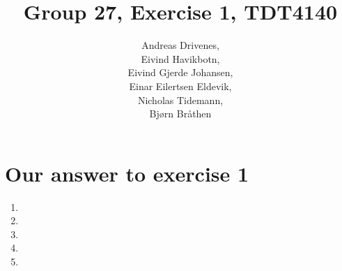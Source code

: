 \documentclass[english, a4paper]{article}
\title{Group 27, Exercise 1, TDT4140}
\author{	Andreas Drivenes,\\
		Eivind Havikbotn,\\
		Eivind Gjerde Johansen,\\
		Einar Eilertsen Eldevik,\\
		Nicholas Tidemann,\\
		Bjørn Bråthen\\
}
\begin{document}

\maketitle

\section{Our answer to exercise 1}
\begin{enumerate}

\item{}

\item{}

\item{}

\item{}
\newpage
\item{}

\end{enumerate}

\end{document}
